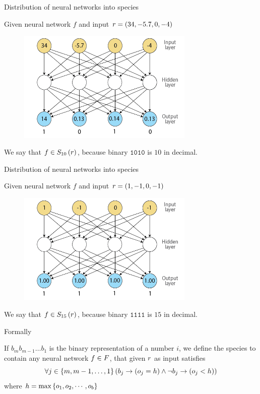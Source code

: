 \begin{frame}{Distribution of neural networks into species}
\begin{center}
Given neural network $f$ and input $r = (34, -5.7, 0, -4)$
  \begin{figure}[p]
  \includegraphics[width=0.75\textwidth]{images/nntdexample2.png}
  \end{figure}
We say that $f \in S_{10}\left(r\right)$, because binary $\texttt{1010}$ is $10$ in decimal.
\end{center}
\end{frame}

\begin{frame}{Distribution of neural networks into species}
\begin{center}
Given neural network $f$ and input $r = (1, -1, 0, -1)$
  \begin{figure}[p]
  \includegraphics[width=0.75\textwidth]{images/nntdexample3.png}
  \end{figure}
We say that $f \in S_{15}\left(r\right)$, because binary $\texttt{1111}$ is $15$ in decimal.
\end{center}
\end{frame}

\begin{frame}{Formally}
\begin{center}
If $b_{m}b_{m-1}\dots b_1$ is the binary representation of a number $i$, we define the species  to contain any neural network $f \in F$, that given $r$ as input satisfies
\begin{equation}
  \forall j \in \left\{ m, m-1, \dots, 1 \right\} \left(b_j \rightarrow (o_j = h) \wedge \neg b_j \rightarrow (o_j < h)\right)
\end{equation}
where $h = \max\left\{ o_1, o_2, \cdots, o_b \right\}$
\end{center}
\end{frame}


